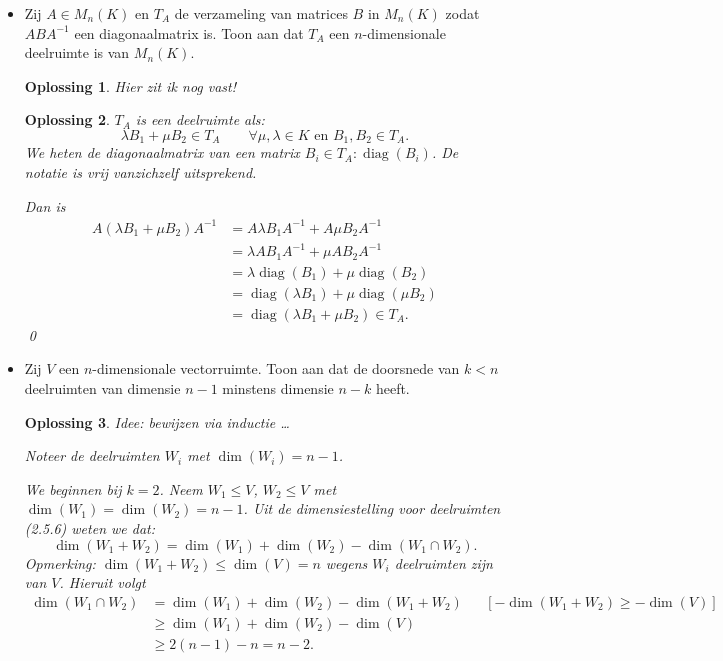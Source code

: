 \documentclass[a4paper,12pt]{article}
\newtheorem{oplossing}{Oplossing}
\begin{document}
\begin{enumerate}
\begin{itemize}
    \item[(iii)] Zij $A \in M_n(K)$ en $T_A$ de verzameling van matrices $B$ in $M_n(K)$ zodat $ABA^{-1}$ een diagonaalmatrix is. Toon aan dat $T_A$ een $n$-dimensionale deelruimte is van $M_n(K)$.
    \begin{oplossing}
        Hier zit ik nog vast!
    \end{oplossing}
    \begin{oplossing}
        \(T_A\) is een deelruimte als: 
        \[
        \lambda B_1 + \mu B_2 \in T_A \qquad \forall \mu, \lambda \in K \text{ en } B_1 , B_2 \in T_A.
        \]
        We heten de diagonaalmatrix van een matrix \(B_i \in T_A: \operatorname{diag}(B_i)\). 
        De notatie is vrij vanzichzelf uitsprekend.

        Dan is
        \begin{align*}
            A \left(\lambda B_1 + \mu B_2\right) A^{-1} 
            &= A \lambda B_1 A^{-1} + A \mu B_2 A^{-1} \\
            &=  \lambda A B_1 A^{-1} + \mu A  B_2 A^{-1} \\
            &=   \lambda \operatorname{diag}(B_1) + \mu \operatorname{diag}(B_2) \\
            &=  \operatorname{diag}(\lambda B_1) + \mu \operatorname{diag}( \mu B_2) \\
            &= \operatorname{diag}(\lambda B_1 + \mu B_2) \in T_A.
        \end{align*}\qed
    \end{oplossing}
    \item[(iv)] Zij $V$ een $n$-dimensionale vectorruimte. Toon aan dat de doorsnede van $k < n$ deelruimten van dimensie $n-1$ minstens dimensie $n-k$ heeft.
    
    \begin{oplossing}
        Idee: bewijzen via inductie \dots

        Noteer de deelruimten \(W_i\) met \(\dim (W_i) = n-1\).

        We beginnen bij \(k = 2\). Neem \(W_1 \le V \), \(W_2 \le V\) met \(\dim(W_1) = \dim(W_2) = n-1\).
        Uit de dimensiestelling voor deelruimten (2.5.6) weten we dat:
        \[
        \dim(W_1 +W_2) = \dim(W_1) + \dim (W_2) - \dim(W_1 \cap W_2).
        \]
        Opmerking: \(\dim(W_1 + W_2) \leq \dim(V) = n \) wegens \(W_i\) deelruimten zijn van \(V\).
        Hieruit volgt
        \begin{align*}
            \dim(W_1 \cap W_2)
            &= \dim(W_1) + \dim (W_2) - \dim(W_1 +W_2) && [- \dim(W_1 + W_2)\geq - \dim(V)] \\
            &\geq \dim(W_1) + \dim (W_2) - \dim(V) \\
            &\geq 2(n-1) -n = n-2.
        \end{align*}


\end{oplossing}
\end{itemize}
\end{enumerate}
\end{document}
